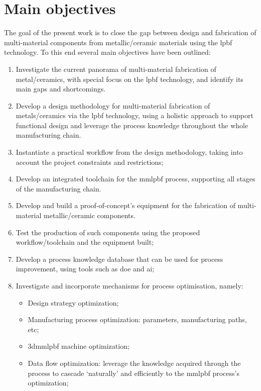 \section{Main objectives}
The goal of the present work is to close the gap between design and fabrication
of multi-material components from metallic/ceramic materials using
the \gls{lpbf} technology.
To this end several main objectives have been outlined:
\begin{enumerate}
  \item Investigate the current panorama of multi-material fabrication of
    metal/ceramics, with special focus on the \gls{lpbf} technology, and
    identify its main gaps and shortcomings.
  \item Develop a design methodology for multi-material fabrication of
    metals/ceramics via the \gls{lpbf} technology, using a holistic approach
    to support functional design and leverage the process knowledge throughout
    the whole manufacturing chain.
  \item Instantiate a practical workflow from the design methodology, taking
    into account the project constraints and restrictions;
  \item Develop an integrated toolchain for the \gls{mmlpbf} process, supporting
    all stages of the manufacturing chain.
  \item Develop and build a proof-of-concept's equipment for the fabrication of
    multi-material metallic/ceramic components.
  \item Test the production of such components using the proposed
    workflow/toolchain and the equipment built;
  \item Develop a process knowledge database that can be used for process
    improvement, using tools such as \gls{doe} and \gls{ai};
  \item Investigate and incorporate mechanisms for process optimisation, namely:
    \begin{itemize}
      \item Design strategy optimization;
      \item Manufacturing process optimization: parameters, manufacturing paths,
        etc;
      \item \gls{3dmmlpbf} machine optimization; 
      \item Data flow optimization: leverage the knowledge acquired through the
        process to cascade `naturally' and efficiently to the
        \gls{mmlpbf} process's optimization;
    \end{itemize}
\end{enumerate}


